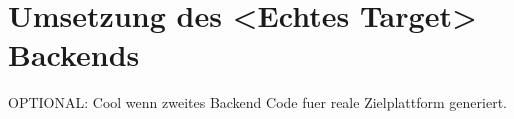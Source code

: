 \chapter{Umsetzung des <Echtes Target> Backends}
\label{chap:build:realBackend}

OPTIONAL: Cool wenn zweites Backend Code fuer reale Zielplattform generiert.
